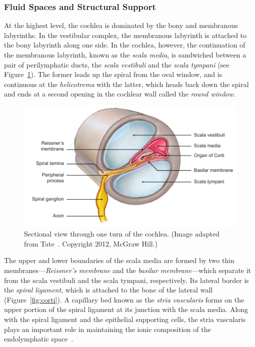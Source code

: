 \subsubsection{Fluid Spaces and Structural Support}

At the highest level, the cochlea is dominated by the bony and membranous
labyrinths. In the vestibular complex, the membranous labyrinth is attached to
the bony labyrinth along one side. In the cochlea, however, the continuation of
the membranous labyrinth, known as the \emph{scala media}, is sandwiched between a
pair of perilymphatic ducts, the \emph{scala vestibuli} and the \emph{scala
tympani} (see Figure~\ref{fig:cochlea}). The former leads up the spiral from the
oval window, and is continuous at the \emph{helicotrema} with the latter, which
heads back down the spiral and ends at a second opening in the cochlear wall
called the \emph{round window}.

\begin{figure}[p]
	\centering
	\includegraphics[width=14.6cm]{Background/cochlear_turn}
	\caption[Sectional view through one turn of the cochlea]{Sectional view
	through one turn of the cochlea. (Image adapted from
	Tate~\cite{tate2012}. Copyright \textcopyright{} 2012, McGraw Hill.)}
	\label{fig:cochlea}
\end{figure}

The upper and lower boundaries of the scala media are formed by two thin
membranes---\emph{Reissner's membrane} and the \emph{basilar membrane}---which
separate it from the scala vestibuli and the scala tympani, respectively. Its
lateral border is the \emph{spiral ligament}, which is attached to the bone of
the lateral wall (Figure~\ref{fig:corti}). A capillary bed known as the
\emph{stria vascularis} forms on the upper portion of the spiral ligament at its
junction with the scala media. Along with the spiral ligament and the epithelial
supporting cells, the stria vascularis plays an important role in maintaining
the ionic composition of the endolymphatic space~\cite{flint2010}.

